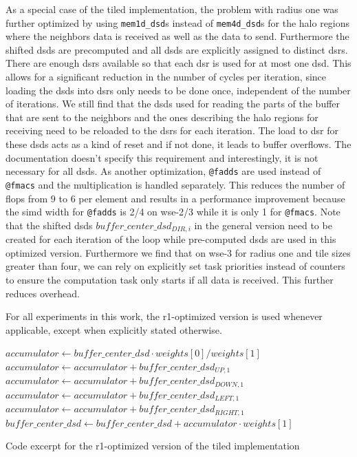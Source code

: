 As a special case of the tiled implementation, the problem with radius one was further optimized by using \texttt{mem1d\_dsd}s instead of \texttt{mem4d\_dsd}s for the halo regions where the neighbors data is received as well as the data to send. Furthermore the shifted \acp{dsd} are precomputed and all \acp{dsd} are explicitly assigned to distinct \acp{dsr}. There are enough \acp{dsr} available so that each \ac{dsr} is used for at most one \ac{dsd}. This allows for a significant reduction in the number of cycles per iteration, since loading the \acp{dsd} into \acp{dsr} only needs to be done once, independent of the number of iterations. We still find that the \acp{dsd} used for reading the parts of the buffer that are sent to the neighbors and the ones describing the halo regions for receiving need to be reloaded to the \acp{dsr} for each iteration. The load to \ac{dsr} for these \acp{dsd} acts as a kind of reset and if not done, it leads to buffer overflows. The documentation doesn't specify this requirement and interestingly, it is not necessary for all \acp{dsd}. 
As another optimization, \texttt{@fadds} are used instead of \texttt{@fmacs} and the multiplication is handled separately. This reduces the number of \acp{flop} from $9$ to $6$ per element and results in a performance improvement because the \ac{simd} width for \texttt{@fadds} is 2/4 on wse-2/3 while it is only 1 for \texttt{@fmacs}. Note that the shifted \acp{dsd} $buffer\_center\_dsd_{DIR,i}$ in the general version need to be created for each iteration of the loop while pre-computed \acp{dsd} are used in this optimized version.
Furthermore we find that on \ac{wse}-3 for radius one and tile sizes greater than four, we can rely on explicitly set task priorities instead of counters to ensure the computation task only starts if all data is received. This further reduces overhead. 

For all experiments in this work, the r1-optimized version is used whenever applicable, except when explicitly stated otherwise.

\begin{algorithm}[tbh]
    \SetAlgoLined
    $accumulator \gets buffer\_center\_dsd \cdot weights[0]/weights[1]$\;
    $accumulator \gets accumulator + buffer\_center\_dsd_{UP,1}$\;
    $accumulator \gets accumulator + buffer\_center\_dsd_{DOWN,1}$\;
    $accumulator \gets accumulator + buffer\_center\_dsd_{LEFT,1}$\;
    $accumulator \gets accumulator + buffer\_center\_dsd_{RIGHT,1}$\;
    $buffer\_center\_dsd \gets buffer\_center\_dsd + accumulator \cdot weights[1]$\;
    \caption{Code excerpt for the r1-optimized version of the tiled implementation}\label{alg:r1_tiled_algorithm}
\end{algorithm}

